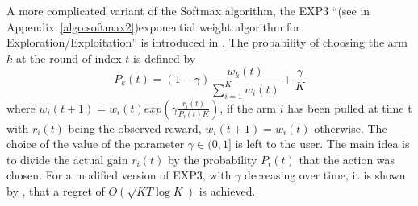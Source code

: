 A more complicated variant of the Softmax algorithm, the EXP3 ``(see in Appendix~\ref{algo:softmax2})exponential weight algorithm for Exploration/Exploitation'' is introduced in \cite{auer1995gambling}. The probability of choosing the arm $k$ at the round of index $t$ is defined by 
\begin{equation}
P_k(t) = (1-\gamma)\frac{w_k(t)}{\sum_{i=1}^{K}w_i(t)}+\frac{\gamma}{K}
\end{equation}
where $w_i(t+1) = w_i(t) exp\left(\gamma\frac{r_i(t)}{P_i(t)K}\right)$,
if the arm $i$ has been pulled at time t with $r_i(t)$ being the observed reward,
$w_i(t+1) = w_i(t)$ otherwise. The choice of the value of the parameter $\gamma\in (0,1]$ is left to the user.
The main idea is to divide the actual gain $r_i(t)$ by the probability $P_i(t)$ that the action was chosen. For a modified version of EXP3, with $\gamma$ decreasing over time, it is shown by \cite{auer2003nonstochastic}, that a regret of $O(\sqrt{KT\log{K}})$ is achieved.
